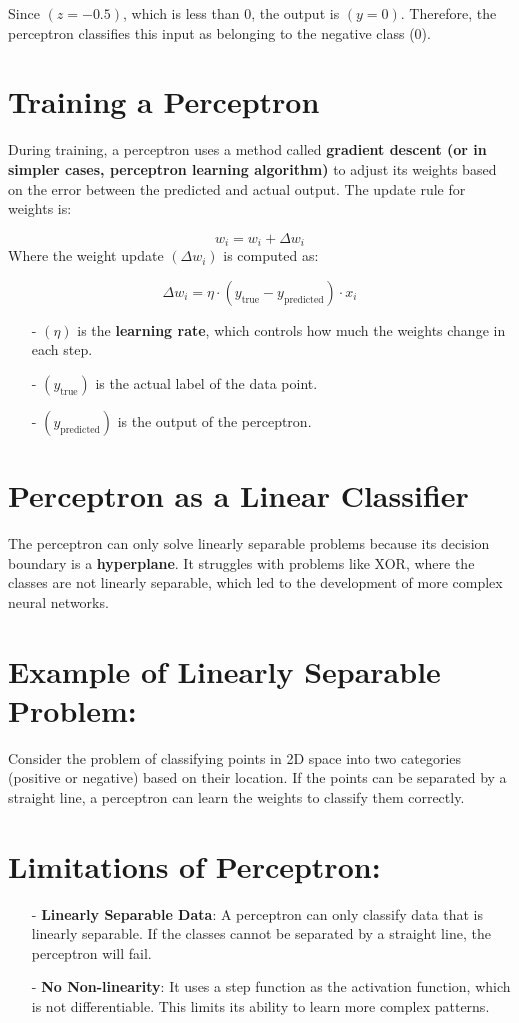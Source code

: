 \documentclass[10pt]{article}
\begin{document}
Since $(z = -0.5)$, which is less than 0, the output is $(y = 0)$. Therefore, the perceptron classifies this input as belonging to the negative class (0).

\section{ Training a Perceptron}
During training, a perceptron uses a method called {\bf gradient descent 
(or in simpler cases, perceptron learning algorithm)} to adjust its weights based on the error between the predicted and actual output. The update rule for weights is:

$$
w_i = w_i + \Delta w_i
$$
Where the weight update $(\Delta w_i)$ is computed as:

$$
\Delta w_i = \eta \cdot (y_{\text{true}} - y_{\text{predicted}}) \cdot x_i
$$

\begin{itemize}
   \item [-] $(\eta)$ is the {\bf learning rate}, which controls how much the weights change in each step.
   \item [-] $(y_{\text{true}})$ is the actual label of the data point.
   \item [-] $(y_{\text{predicted}})$ is the output of the perceptron.
\end{itemize}

\section{ Perceptron as a Linear Classifier}
The perceptron can only solve linearly separable problems because its decision boundary is a {\bf hyperplane}. It struggles with problems like XOR, where the classes are not linearly separable, which led to the development of more complex neural networks.

\section{ Example of Linearly Separable Problem:}
Consider the problem of classifying points in 2D space into two categories (positive or negative) based on their location. If the points can be separated by a straight line, a perceptron can learn the weights to classify them correctly.

\section{ Limitations of Perceptron:}
\begin{itemize}
   \item [-] {\bf Linearly Separable Data}: A perceptron can only classify data that is linearly separable. If the classes cannot be separated by a straight line, the perceptron will fail.
   \item [-] {\bf No Non-linearity}: It uses a step function as the activation function, which is not differentiable. This limits its ability to learn more complex patterns.
\end{itemize}
\end{document}
